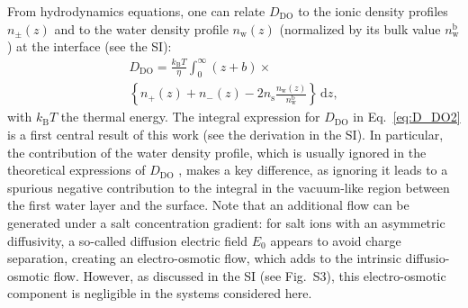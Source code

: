 \documentclass[journal=ancac3,manuscript=article,layout=twocolumn]{achemso}
\newcommand{\kt}{k_\text{B}T}
\newcommand{\ns}{n_\text{s}}
\begin{document}
From hydrodynamics equations, one can relate $D_\text{DO}$ to the ionic density profiles $n_\pm(z)$ and to the water density profile $n_\text{w}(z)$ (normalized by its bulk value $n_\text{w}^\text{b}$) at the interface (see the SI):
\begin{multline}\label{eq:D_DO2}
    D_\text{DO} = \frac{\kt}{\eta} \int_0^{\infty} \left( z + b \right) \times \\ \left\{ n_+(z) + n_-(z) - 2 \ns \frac{n_\text{w}(z)}{n_\text{w}^\text{b}} \right\} \, \mathrm{d}z ,
\end{multline}
with $k_\text{B}T$ the thermal energy.
The integral expression for  $D_\mathrm{DO}$ in Eq.~\eqref{eq:D_DO2} is a first
central result of this work (see the derivation in the SI).
In particular, the contribution of the water density profile, which is usually ignored in the theoretical expressions of $D_\mathrm{DO}$ \cite{Mouterde2018,marbach2019osmosis}, makes a key difference, as ignoring it leads to a spurious negative contribution to the integral in the vacuum-like
region between the first water layer and the surface.
%
Note that an additional flow can be generated under a salt concentration gradient: for salt ions with an asymmetric diffusivity, a so-called diffusion electric field $E_0$ appears to avoid charge separation, creating an electro-osmotic flow, which adds to the intrinsic diffusio-osmotic flow\cite{anderson1989colloid,Lee2014b}. However, as discussed in the SI (see Fig.~S3), this
electro-osmotic component is negligible
in the systems considered here.
\end{document}
